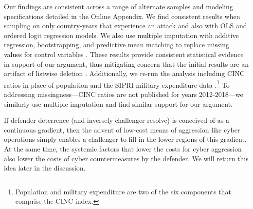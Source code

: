 \documentclass[11pt,letterpaper,pdftex,dvipsnames,table]{article}
\begin{document}
Our findings are consistent across a range of alternate samples and modeling specifications detailed in the Online Appendix. We find consistent results when sampling on only country-years that experience an attack and also with OLS and ordered logit regression models. We also use multiple imputation with additive regression, bootstrapping, and predictive mean matching to replace missing values for control variables \citep{buuren_flexibleimputationmissing_2012}. These results provide consistent statistical evidence in support of our argument, thus mitigating concern that the initial results are an artifact of listwise deletion \citep{lall_howmultipleimputation_2017, arel-bundock_whencanmultiple_2018}. Additionally, we re-run the analysis including CINC ratios in place of population and the SIPRI military expenditure data \citep{singer_capabilitydistributionuncertainty_1972}.\footnote{Population and military expenditure are two of the six components that comprise the CINC index.} To addressing missingness---CINC ratios are not published for years 2012-2018---we similarly use multiple imputation and find similar support for our argument. 

If defender deterrence (and inversely challenger resolve) is conceived of as a continuous gradient, then the advent of low-cost means of aggression like cyber operations simply enables a challenger to fill in the lower regions of this gradient. At the same time, the systemic factors that lower the costs for cyber aggression also lower the costs of cyber countermeasures by the defender. We will return this idea later in the discussion.
\end{document}

